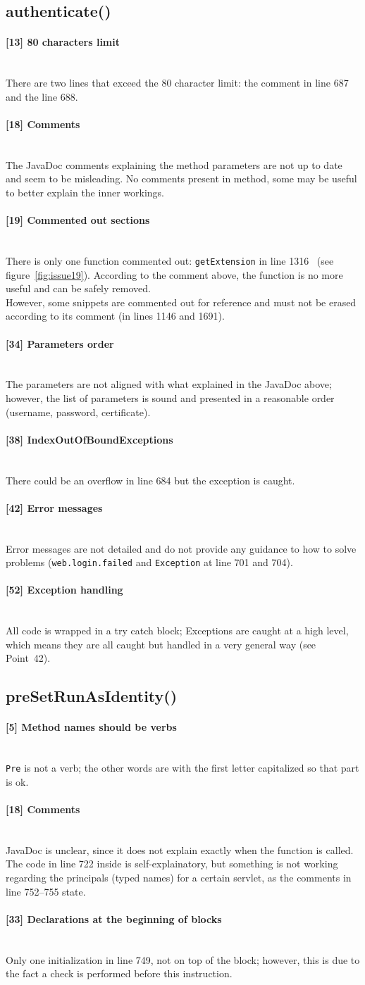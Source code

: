 \documentclass[a4paper, 11pt]{article}
\newcommand{\code}[1]{\texttt{#1}}
\newcommand{\issue}[3][?]{
    \paragraph{[#1] #2} \mbox{}\\ #3
}
\begin{document}
\subsection{authenticate()} %
\label{sub:auth}
\issue[13]{80 characters limit}{
    There are two lines that exceed the 80 character limit: the comment
    in line 687 and the line 688. 
}

\issue[18]{Comments} {
The JavaDoc comments explaining the method parameters are not up to date 
and seem to be misleading. No comments present in method, some may be useful 
to better explain the inner workings.
}

\issue[19]{Commented out sections} {
    There is only one function commented out: \code{getExtension} in line 1316 \
    (see figure~\ref{fig:issue19}).
    According to the comment above, the function is no more useful and can 
    be safely removed.  \\
    However, some snippets are commented out for reference and must not be 
    erased according to its comment (in lines 1146 and 1691). 
}

\issue[34]{Parameters order} {
    The parameters are not aligned with what explained in the JavaDoc above; 
    however, the list of parameters is sound and presented in a reasonable order (username, password, certificate). 
}

\issue[38]{IndexOutOfBoundExceptions} {
    There could be an overflow in line 684 but the exception is caught.
}

\issue[42]{Error messages} {
Error messages are not detailed and do not provide any guidance to 
how to solve problems (\code{web.login.failed} and \code{Exception} at
line 701 and 704).
}

\issue[52]{Exception handling} {
All code is wrapped in a try catch block; Exceptions are caught at a high level, 
which means they are all caught but handled in a very general way 
(see Point~42).
}

\subsection{preSetRunAsIdentity()}

\issue[5]{Method names should be verbs} {
    \code{Pre} is not a verb; the other words are with the first letter
    capitalized so that part is ok.
}

\issue[18]{Comments} {
JavaDoc is unclear, since it does not explain exactly when the function is 
called. The code in line 722 inside is self-explainatory, but something is 
not working regarding the principals (typed names) for a certain servlet, 
as the comments in line 752--755 state.
}
\issue[33]{Declarations at the beginning of blocks} {
Only one initialization in line 749, not on top of the block; however, 
this is due to the fact a check is performed before this instruction.
}
\end{document}
